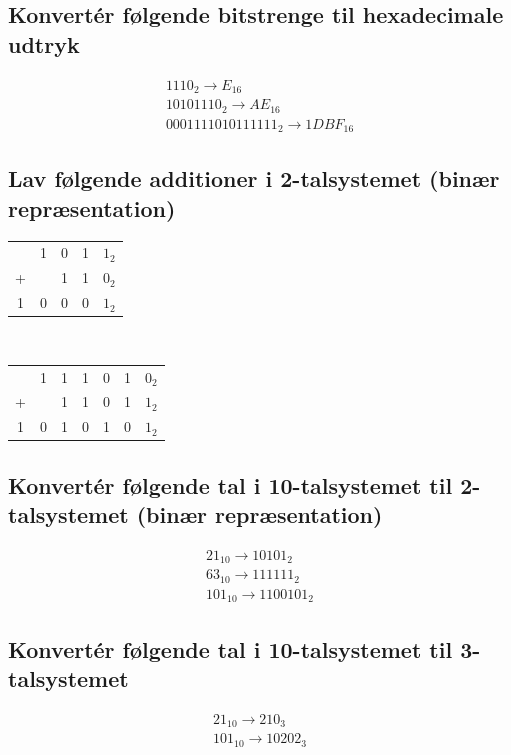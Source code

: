 \documentclass[12pt, a4paper]{article}
\begin{document}
			\subsection{Konvertér følgende bitstrenge til hexadecimale udtryk}
			\begin{align*}
				1110_{2} \rightarrow E_{16}\\
				10101110_{2} \rightarrow AE_{16}\\
				0001 1110 1011 1111_{2} \rightarrow 1DBF_{16}
			\end{align*}
			\subsection{Lav følgende additioner i 2-talsystemet (binær repræsentation)}
			\begin{center}
				\begin{tabular}{ccccc}
				  & 1 & 0 & 1 & $1_2$ \\
				+ &   & 1 & 1 & $0_2$ \\
				\hline
				1 & 0 & 0 & 0 & $1_2$ \\
			\end{tabular}\\[5mm]
				\begin{tabular}{ccccccc}
				  & 1 & 1 & 1 & 0 & 1 & $0_2$ \\
				+ &  & 1 & 1 & 0 & 1 & $1_2$\\
				\hline
				 1 & 0 & 1 & 0 & 1 & 0 & $1_2$ \\
				\end{tabular}
			\end{center}
			\subsection{Konvertér følgende tal i 10-talsystemet til 2-talsystemet (binær repræsentation)}
			\begin{align*}
				21_{10} \rightarrow 10101_2\\
				63_{10} \rightarrow 111111_2\\
				101_{10} \rightarrow 1100101_2
			\end{align*}
			\subsection{Konvertér følgende tal i 10-talsystemet til 3-talsystemet}
			\begin{align*}
				21_{10} \rightarrow 210_3\\
				101_{10} \rightarrow 10202_3
			\end{align*}
\end{document}

